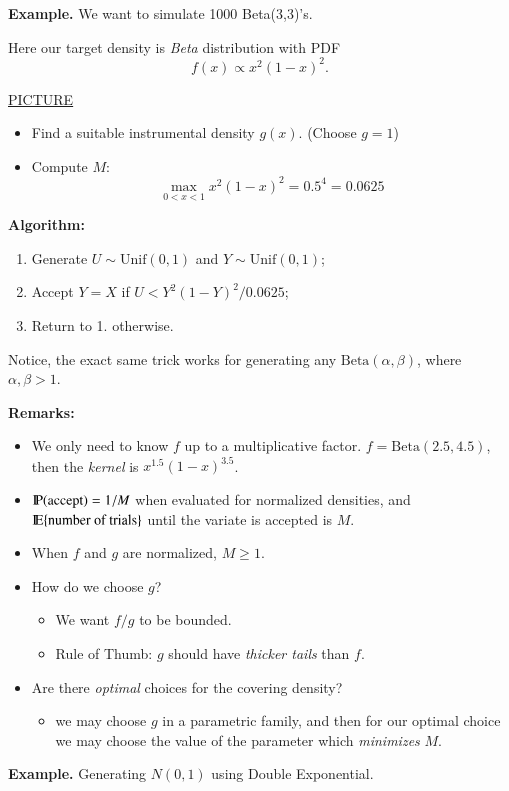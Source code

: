 \documentclass[captions=tableheading]{scrbook}
\begin{document}
\textbf{Example.} We want to simulate 1000 Beta(3,3)'s.

Here our target density is \emph{Beta} distribution with PDF 
\[
f(x)\propto x^{2}(1-x)^{2}.
\]

\underline{PICTURE}

\vspace{1in}


\begin{itemize}
\item Find a suitable instrumental density $g(x)$. (Choose $g=1$)
\item Compute $M$: 
   \[
   \max_{0<x<1}x^{2}(1-x)^{2}=0.5^{4}=0.0625
   \]
\end{itemize}

\textbf{Algorithm:}

\begin{enumerate}
\item Generate $U \sim \mathrm{Unif}(0,1)$ and $Y \sim \mathrm{Unif}(0,1)$;
\item Accept $Y = X$ if $U < Y^{2}(1-Y)^{2}/0.0625$;
\item Return to 1. otherwise.
\end{enumerate}

Notice, the exact same trick works for generating any $\mathrm{Beta}(\alpha,\beta)$, where $\alpha,\beta>1$.

\textbf{Remarks:}

\begin{itemize}
\item We only need to know $f$ up to a multiplicative factor.
  $f=\mathrm{Beta}(2.5,4.5)$, then the \emph{kernel} is $x^{1.5}(1-x)^{3.5}$.
\item $\P(\mbox{accept})=1/M$ when evaluated for normalized densities, and \newline $\E\{\mbox{number of trials}\}$ until the variate is accepted is $M$.
\item When $f$ and $g$ are normalized, $M \geq 1$.
\item How do we choose $g$?
\begin{itemize}
\item We want $f/g$ to be bounded.
\item Rule of Thumb: $g$ should have \emph{thicker tails} than $f$.
\end{itemize}
\item Are there \emph{optimal} choices for the covering density?
\begin{itemize}
\item we may choose $g$ in a parametric family, and then for our optimal choice we may choose the value of the parameter which \emph{minimizes} $M$.
\end{itemize}
\end{itemize}
\textbf{Example.} Generating $N(0,1)$ using Double Exponential.
\end{document}
